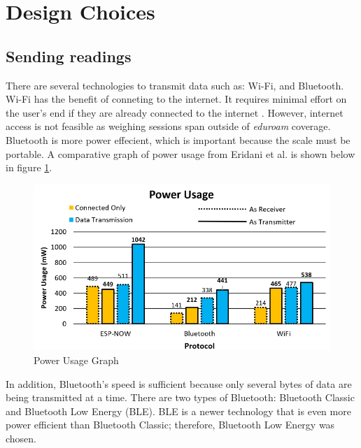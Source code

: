 \documentclass[class=report,11pt,crop=false]{standalone}
\begin{document}
	
	\section{Design Choices}
		
		\subsection{Sending readings}
		There are several technologies to transmit data such as: Wi-Fi, and Bluetooth. 
		Wi-Fi has the benefit of conneting to the internet. It requires minimal effort on the user's end if they are already connected to the internet . However, internet access is not feasible as weighing sessions span outside of \textit{eduroam} coverage.
		Bluetooth is more power effecient, which is important because the scale must be portable. 
		A comparative graph of power usage from Eridani et al. \cite{comparitiveEspnow} is shown below in figure \ref{fig:power-usage}.
		
		\begin{figure}[h!]
			\centering
			\includegraphics[scale=0.7]{"Figures/Power usage"}
			\caption{Power Usage Graph}
			\label{fig:power-usage}
		\end{figure}
		
		In addition, Bluetooth's speed is sufficient because only several bytes of data are being transmitted at a time.
		There are two types of Bluetooth: Bluetooth Classic and Bluetooth Low Energy (BLE). BLE is a newer technology that is even more power efficient than Bluetooth Classic; therefore, Bluetooth Low Energy was chosen.
		
		
		
\end{document}
